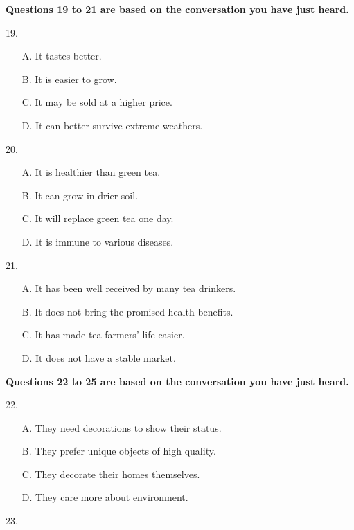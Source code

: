 \documentclass[UTF8,11pt]{ctexart}
\begin{document}
\textbf{Questions 19 to 21 are based on the conversation you have just heard.}


19.


\begin{itemize}[leftmargin=2em,itemsep=.2em,topsep=.4em]\item[A.] It tastes better.
\item[B.] It is easier to grow.
\item[C.] It may be sold at a higher price.
\item[D.] It can better survive extreme weathers.
\end{itemize}

20.


\begin{itemize}[leftmargin=2em,itemsep=.2em,topsep=.4em]\item[A.] It is healthier than green tea.
\item[B.] It can grow in drier soil.
\item[C.] It will replace green tea one day.
\item[D.] It is immune to various diseases.
\end{itemize}

21.


\begin{itemize}[leftmargin=2em,itemsep=.2em,topsep=.4em]\item[A.] It has been well received by many tea drinkers.
\item[B.] It does not bring the promised health benefits.
\item[C.] It has made tea farmers' life easier.
\item[D.] It does not have a stable market.
\end{itemize}

\textbf{Questions 22 to 25 are based on the conversation you have just heard.}


22.


\begin{itemize}[leftmargin=2em,itemsep=.2em,topsep=.4em]\item[A.] They need decorations to show their status.
\item[B.] They prefer unique objects of high quality.
\item[C.] They decorate their homes themselves.
\item[D.] They care more about environment.
\end{itemize}

23.
\end{document}
